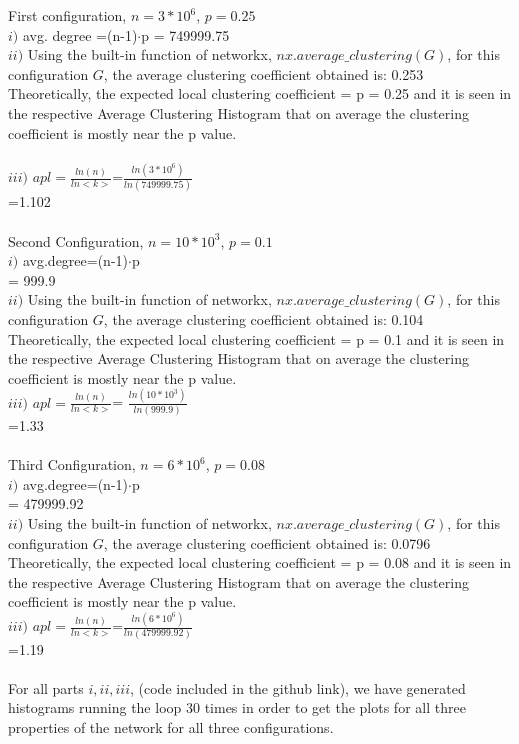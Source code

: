 \documentclass[answers]{exam}
\begin{document}
\begin{questions}
\begin{framed}
First configuration, $n=3*10^6$, $p=0.25$\\$i)$ avg. degree =(n-1)$\cdot$p = 749999.75\\
$ii)$ Using the built-in function of networkx, $nx.average\_clustering(G)$, for this configuration $G$, the average clustering coefficient obtained is: 0.253\\ 
Theoretically, the expected local clustering coefficient = p = 0.25 and it is seen in the respective Average Clustering Histogram that on average the clustering coefficient is mostly near the p value.\\
\\$iii)$ $apl=\frac{ln(n)}{ln<k>}$=$\frac{ln(3*10^6)}{ln(749999.75)}$\\=1.102\\\\
Second Configuration, $n=10*10^3$, $p=0.1$ \\ $i)$ avg.degree=(n-1)$\cdot$p \\= 999.9 \\
$ii)$ Using the built-in function of networkx, $nx.average\_clustering(G)$, for this configuration $G$, the average clustering coefficient obtained is: 0.104\\ Theoretically, the expected local clustering coefficient = p = 0.1 and it is seen in the respective Average Clustering Histogram that on average the clustering coefficient is mostly near the p value.
\\ $iii)$ $apl=\frac{ln(n)}{ln<k>}$= $\frac{ln(10*10^3)}{ln(999.9)}$\\=1.33\\\\
Third Configuration, $n=6*10^6$, $p=0.08$\\$i)$ avg.degree=(n-1)$\cdot$p \\= 479999.92\\
$ii)$ Using the built-in function of networkx, $nx.average\_clustering(G)$, for this configuration $G$, the average clustering coefficient obtained is: 0.0796\\ Theoretically, the expected local clustering coefficient = p = 0.08 and it is seen in the respective Average Clustering Histogram that on average the clustering coefficient is mostly near the p value.
\\$iii)$ $apl=\frac{ln(n)}{ln<k>}$=$\frac{ln(6*10^6)}{ln(479999.92)}$\\=1.19\\\\
For all parts $i,ii,iii$, (code included in the github link), we have generated histograms running the loop 30 times in order to get the plots for all three properties of the network for all three configurations.

\end{framed}
\end{questions}
\end{document}

